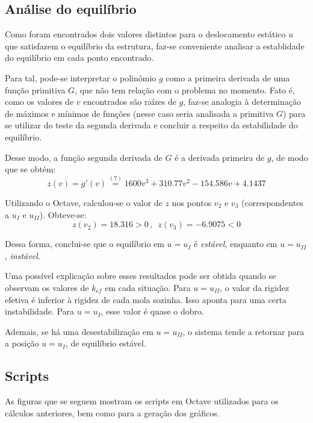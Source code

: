 \documentclass[a4paper, 12pt]{article}
\begin{document}
	\subsection{Análise do equilíbrio}
	
	Como foram encontrados dois valores distintos para o deslocamento estático $u$ que satisfazem o equilíbrio da estrutura, 
	faz-se conveniente analisar a establidade do equilíbrio em cada ponto encontrado. 
	
	Para tal, pode-se interpretar o 
	polinômio $g$ como a primeira derivada de uma função primitiva $G$, que não tem relação com o problema no momento. Fato é,
	como os valores de $v$ encontrados são raízes de $g$, faz-se analogia à determinação de máximos e mínimos de funções 
	(nesse caso seria analisada a primitiva $G$) para se utilizar do teste da segunda derivada e concluir a respeito da 
	estabilidade do equilíbrio.
	
	Desse modo, a função segunda derivada de $G$ é a derivada primeira de $g$, de modo que se obtém:
	$$z(v)=g'(v)\stackrel{(7)}{=}1600v^3+310.77v^2-154.586v+4.1437$$	
	
	Utilizando o Octave, calculou-se o valor de $z$ nos pontos $v_2$ e $v_3$ (correspondentes a $u_I$ e $u_{II}$). Obteve-se:
	$$z(v_2)=18.316>0\,,\,\,\,z(v_3)=-6.9075<0$$
	
	Dessa forma, conclui-se que o equilíbrio em $u=u_I$ é \textit{estável}, enquanto em $u=u_{II}$, \textit{instável}.
	
	Uma possível explicação sobre esses resultados pode ser obtida quando se observam os valores de $k_{ef}$ em cada situação.
	Para $u=u_{II}$, o valor da rigidez efetiva é inferior à rigidez de cada mola sozinha. Isso aponta para uma certa 
	instabilidade. Para $u=u_{I}$, esse valor é quase o dobro.
	
	Ademais, se há uma desestabilização em $u=u_{II}$, o sistema tende a retornar para a posição $u=u_{I}$, de equilíbrio
	estável.
	
	\subsection{Scripts}
	
	As figuras que se seguem mostram os scripts em Octave utilizados para os cálculos anteriores, bem como para a geração
	dos gráficos.
	
\end{document}

